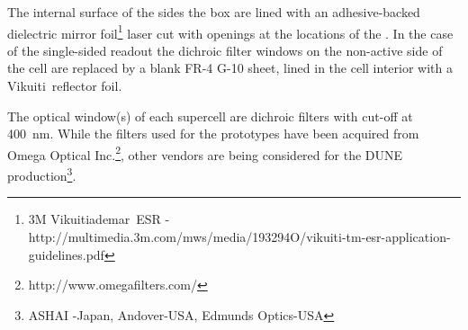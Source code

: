 


The  internal surface of the sides the box are lined with an adhesive-backed dielectric mirror foil\footnote{3M Vikuitiademar\texttrademark\  ESR - http://multimedia.3m.com/mws/media/193294O/vikuiti-tm-esr-application-guidelines.pdf} laser cut with openings at the locations of the .  In the case of the single-sided readout the dichroic filter windows on the non-active side of the cell are replaced by a blank FR-4 G-10 sheet, lined in the cell interior with a Vikuiti\texttrademark\ reflector foil. %


The optical window(s) of each supercell are dichroic filters with cut-off at \SI{400}{nm}. While the filters used for the  prototypes have been acquired from Omega Optical Inc.\footnote{http://www.omegafilters.com/}, other vendors are being considered for the DUNE production\footnote{ASHAI -Japan, Andover-USA, Edmunds Optics-USA}.
   
